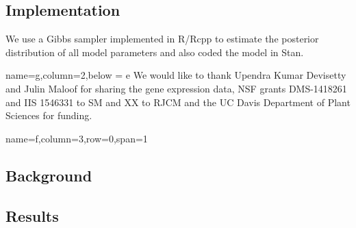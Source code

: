 \documentclass[landscape,paperwidth=48in,paperheight=36in,fontscale=0.35]{baposter}
\begin{document}
\begin{poster}
{\subsection*{Implementation}
We use a Gibbs sampler implemented in R/Rcpp to estimate the posterior distribution of all model parameters and also coded the model in Stan\citep{Carpenter:2015}.

}

 {name=g,column=2,below = e}{
We would like to thank Upendra Kumar Devisetty and Julin Maloof for sharing the gene expression data, NSF grants DMS-1418261 and IIS 1546331 to SM and XX to RJCM and the UC Davis Department of Plant Sciences for funding.
}

 {name=f,column=3,row=0,span=1}{
\subsection*{Background}
\subsection*{Results}

}
\end{poster}
\end{document}

